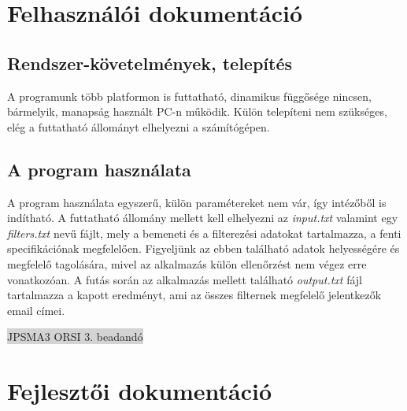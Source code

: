 \documentclass[12pt]{article}
\begin{document}
\section{Felhasználói dokumentáció}

\subsection{Rendszer-követelmények, telepítés}

A programunk több platformon is futtatható, dinamikus függősége nincsen, bármelyik, manapság
használt PC-n működik. Külön telepíteni nem szükséges, elég a futtatható állományt elhelyezni
a számítógépen.

\subsection{A program használata}

A program használata egyszerű, külön paramétereket nem vár, így intézőből is indítható. A
futtatható állomány mellett kell elhelyezni az \textit{input.txt} valamint egy 
\textit{filters.txt} nevű fájlt, mely a bemeneti és a filterezési
adatokat tartalmazza, a fenti specifikációnak megfelelően. Figyeljünk az ebben található
adatok helyességére és megfelelő tagolására, mivel az alkalmazás külön ellenőrzést nem végez
erre vonatkozóan. A futás során az alkalmazás mellett található \textit{output.txt} fájl
tartalmazza a kapott eredményt, ami az összes filternek megfelelő jelentkezők email címei.

\newpage
\thispagestyle{empty}
\begin{center}
	\colorbox{lightgray}{{\large JPSMA3} \hspace{4.3cm} {\large ORSI 3. beadandó} \hspace{5.7cm} \thepage}
\end{center}

\section{Fejlesztői dokumentáció}
\end{document}
